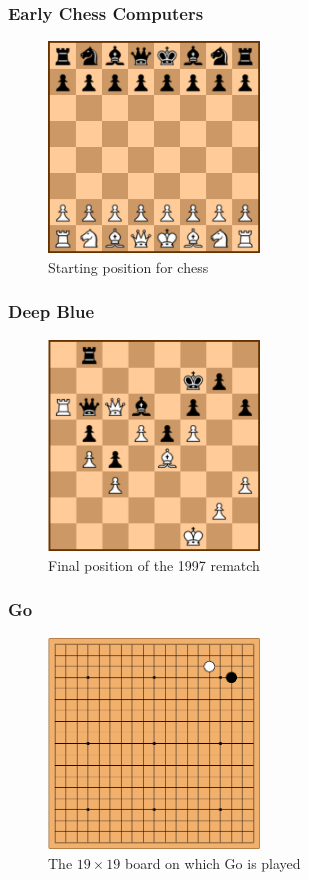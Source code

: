 \documentclass{beamer}
\begin{document}
\begin{frame} %
\frametitle{Early Chess Computers}
\begin{figure}
	\centering
	\includegraphics[width=0.5\textwidth]{images/chessinitial.png}
	\caption{Starting position for chess \cite{chessgames}}
	\label{chessinitial}
\end{figure}
\end{frame}

\begin{frame} %
\frametitle{Deep Blue}
\begin{figure}
	\centering
	\includegraphics[width=0.5\textwidth]{images/deep-blue.png}
	\caption{Final position of the 1997 rematch \cite{chessgames}}
	\label{deep-blue}
\end{figure}
\end{frame}

\begin{frame} %
\frametitle{Go}
\begin{figure}
	\centering
	\includegraphics[width=0.5\textwidth]{images/go.png}
	\caption{The $19\times19$ board on which Go is played \cite{sensei}}
	\label{go}
\end{figure}
\end{frame}
\end{document}
